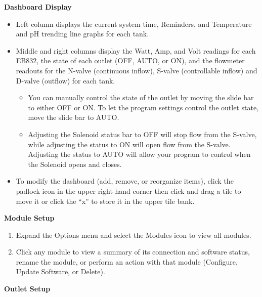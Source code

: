 \documentclass[
]{book}
\providecommand{\tightlist}{%
  \setlength{\itemsep}{0pt}\setlength{\parskip}{0pt}}
\begin{document}
\textbf{Dashboard Display}

\begin{itemize}
\tightlist
\item
  Left column displays the current system time, Reminders, and Temperature and pH trending line graphs for each tank.
\item
  Middle and right columns display the Watt, Amp, and Volt readings for each EB832, the state of each outlet (OFF, AUTO, or ON), and the flowmeter readouts for the N-valve (continuous inflow), S-valve (controllable inflow) and D-valve (outflow) for each tank.

  \begin{itemize}
  \tightlist
  \item
    You can manually control the state of the outlet by moving the slide bar to either OFF or ON. To let the program settings control the outlet state, move the slide bar to AUTO.
  \item
    Adjusting the Solenoid status bar to OFF will stop flow from the S-valve, while adjusting the status to ON will open flow from the S-valve. Adjusting the status to AUTO will allow your program to control when the Solenoid opens and closes.
  \end{itemize}
\item
  To modify the dashboard (add, remove, or reorganize items), click the padlock icon in the upper right-hand corner then click and drag a tile to move it or click the ``x'' to store it in the upper tile bank.
\end{itemize}

\textbf{Module Setup}

\begin{enumerate}
\def\labelenumi{\arabic{enumi}.}
\tightlist
\item
  Expand the Options menu and select the Modules icon to view all modules.
\item
  Click any module to view a summary of its connection and software status, rename the module, or perform an action with that module (Configure, Update Software, or Delete).
\end{enumerate}

\textbf{Outlet Setup}
\end{document}
